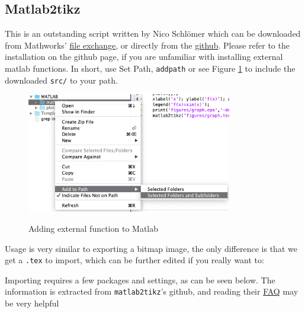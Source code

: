\subsection{Matlab2tikz}
This is an outstanding script written by Nico Schlömer which can be downloaded from Mathworks' \href{https://uk.mathworks.com/matlabcentral/fileexchange/22022-matlab2tikz-matlab2tikz}{file exchange}, or directly from the \href{https://github.com/matlab2tikz/matlab2tikz}{github}. Please refer to the installation on the github page, if you are unfamiliar with installing external matlab functions.
In short, use Set Path, \verb|addpath| or see Figure \ref{fig:setpath} to include the downloaded \verb|src/| to your path.
\clearpage
\begin{figure}[h]
\centering
    \includegraphics[width=0.8\textwidth]{figures/setpath.png}
\label{fig:setpath}
\caption{Adding external function to Matlab}
\end{figure}

Usage is very similar to exporting a bitmap image, the only difference is that we get a \texttt{.tex} to import, which can be further edited if you really want to:



Importing requires a few packages and settings, as can be seen below.
The information is extracted from \texttt{matlab2tikz}'s github, and reading their \href{https://github.com/matlab2tikz/matlab2tikz/wiki/FAQ}{FAQ} may be very helpful 

